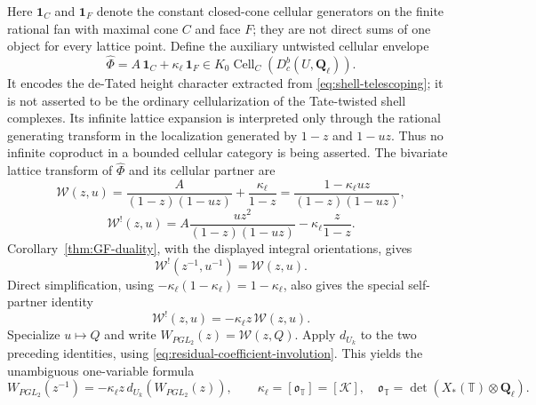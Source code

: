 \documentclass[11pt]{article}
\theoremstyle{definition}
\theoremstyle{remark}
\newcommand{\Qell}{\mathbf Q_\ell}
\newcommand{\Uk}{U_k}
\newcommand{\kappaell}{\kappa_{\ell}}
\newcommand{\one}{\mathbf 1}
\newcommand{\cK}{\mathcal K}
\newcommand{\Cell}{\operatorname{Cell}}
\begin{document}
Here $\one_C$ and $\one_F$ denote the constant closed-cone cellular
generators on the finite rational fan with maximal cone $C$ and face $F$;
they are not direct sums of one object for every lattice point.  Define the
auxiliary untwisted cellular envelope
\begin{equation}
 \widehat\Phi=A\,\one_C+\kappaell\,\one_F
 \in K_0\Cell_C(D_c^b(U,\Qell)).
 \label{eq:residual-skeleton-class}
\end{equation}
It encodes the de-Tated height character extracted from
\eqref{eq:shell-telescoping}; it is not asserted to be the ordinary
cellularization of the Tate-twisted shell complexes.  Its infinite lattice
expansion is interpreted only through the rational
generating transform in the localization generated by $1-z$ and $1-uz$.
Thus no infinite coproduct in a bounded cellular category is being asserted.
The bivariate lattice transform of $\widehat\Phi$ and its cellular partner are
\begin{equation}
 \mathcal W(z,u)
 =\frac{A}{(1-z)(1-uz)}+\frac{\kappaell}{1-z}
 =\frac{1-\kappaell uz}{(1-z)(1-uz)},
 \label{eq:residual-W}
\end{equation}
\begin{equation}
 \mathcal W^!(z,u)
 =A\frac{uz^2}{(1-z)(1-uz)}
 -\kappaell\frac{z}{1-z}.
 \label{eq:residual-partner}
\end{equation}
Corollary~\ref{thm:GF-duality}, with the displayed integral orientations, gives
\begin{equation}
 \mathcal W^!(z^{-1},u^{-1})=\mathcal W(z,u).
 \label{eq:residual-partner-inversion}
\end{equation}
Direct simplification, using $-\kappaell(1-\kappaell)=1-\kappaell$, also gives the
special self-partner identity
\begin{equation}
 \mathcal W^!(z,u)=-\kappaell z\,\mathcal W(z,u).
 \label{eq:residual-partner-identification}
\end{equation}
Specialize $u\mapsto Q$ and write
$W_{PGL_2}(z)=\mathcal W(z,Q)$.  Apply $d_{\Uk}$ to
the two preceding identities, using
\eqref{eq:residual-coefficient-involution}.  This yields the unambiguous
one-variable formula
\begin{equation}
 \boxed{W_{PGL_2}(z^{-1})
 =-\kappaell z\,d_{\Uk}(W_{PGL_2}(z)),
 \qquad \kappaell=[\mathfrak o_{\mathbb T}]=[\cK],\quad
 \mathfrak o_{\mathbb T}=\det(X_*(\mathbb T)\otimes\Qell).}
 \label{eq:quadratic-residual-orientation-reciprocity}
\end{equation}
\end{document}
